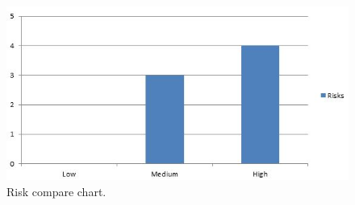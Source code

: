 \begin{figure}[h!]
  \centering
    \includegraphics{./Graphics/riskchart.JPG}
 \caption{Risk compare chart.}
\end{figure}
